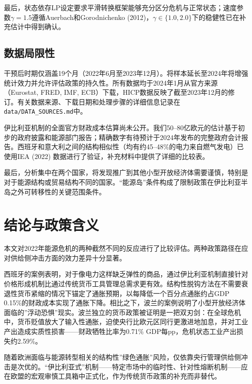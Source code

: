 \documentclass[12pt, a4paper]{article}
\begin{document}
最后，状态依存LP设定要求平滑转换框架能够充分区分危机与正常状态；速度参数$\gamma = 1.5$遵循Auerbach和Gorodnichenko (2012)，$\gamma \in \{1.0, 2.0\}$下的稳健性已在补充估计中得到确认。


\subsection{数据局限性}

干预后时期仅涵盖19个月（2022年6月至2023年12月）。将样本延长至2024年将增强统计效力并允许评估政策的持久性。所有数据均于2024年1月从官方来源（Eurostat, FRED, IMF, ECB）下载，HICP数据反映了截至2023年12月的修订。有关数据来源、下载日期和处理步骤的详细信息记录在\texttt{data/DATA\_SOURCES.md}中。

伊比利亚机制的全面官方财政成本估算尚未公开。我们50–80亿欧元的估计基于初步的政府披露和能源部门报告；精确数字有待预计于2024年发布的完整政府会计报告。西班牙和意大利之间的结构相似性（均有约45–48\%的电力来自燃气发电）已使用IEA (2022) 数据进行了验证，补充材料中提供了详细的比较表。

最后，分析集中在两个国家，将发现推广到其他小型开放经济体需要谨慎，特别是对于能源结构或贸易结构不同的国家。“能源岛”条件构成了限制政策在伊比利亚半岛之外可转移性的关键范围条件。



\section{结论与政策含义}

本文对2022年能源危机的两种截然不同的反应进行了比较评估。两种政策路径在应对供给侧冲击方面的效力差异十分显著。

西班牙的案例表明，对于像电力这样缺乏弹性的商品，通过伊比利亚机制直接针对价格形成机制比通过传统货币工具管理总需求更有效。结构性脱钩方法在不需要衰退性货币紧缩的情况下锚定了通胀预期，以每降低一个百分点通胀约占GDP 0.15\%的财政成本实现了通胀下降。相比之下，波兰的案例说明了小型开放经济体面临的”浮动恐惧”现实。波兰独立的货币政策被证明是一把双刃剑：在全球危机中，货币贬值放大了输入性通胀，迫使央行比欧元区同行更激进地加息，并对工业产出造成实质性损害——财政牺牲比率为0.71\% GDP每pp，危机状态工业产出损失约2.59\%。

随着欧洲面临与能源转型相关的结构性”绿色通胀”风险，仅依靠央行管理供给侧冲击是次优的。“伊比利亚式”机制——特定市场中的临时性、针对性熔断机制——应在欧盟的宏观审慎工具箱中正式化，作为传统货币政策的补充而非替代。
\end{document}

